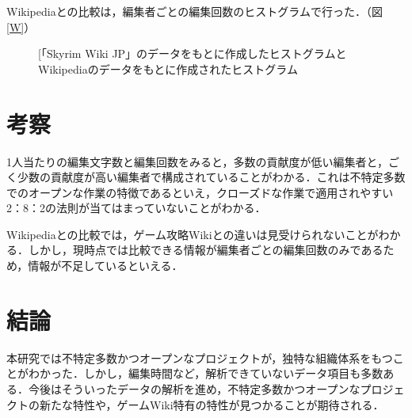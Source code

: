 \documentclass[uplatex,twocolumn,dvipdfmx]{jsarticle}
\begin{document}
Wikipediaとの比較は，編集者ごとの編集回数のヒストグラムで行った．（図\ref{W}）


\begin{figure}[t]
 \begin{center}
 \caption{[「Skyrim Wiki JP」のデータをもとに作成したヒストグラムとWikipediaのデータをもとに作成されたヒストグラム}
\end{center}
 \end{figure}
 
\section{考察}

1人当たりの編集文字数と編集回数をみると，多数の貢献度が低い編集者と，ごく少数の貢献度が高い編集者で構成されていることがわかる．これは不特定多数でのオープンな作業の特徴であるといえ，クローズドな作業で適用されやすい2：8：2の法則が当てはまっていないことがわかる．

Wikipediaとの比較では，ゲーム攻略Wikiとの違いは見受けられないことがわかる．しかし，現時点では比較できる情報が編集者ごとの編集回数のみであるため，情報が不足しているといえる．

\section{結論}

本研究では不特定多数かつオープンなプロジェクトが，独特な組織体系をもつことがわかった．しかし，編集時間など，解析できていないデータ項目も多数ある．今後はそういったデータの解析を進め，不特定多数かつオープンなプロジェクトの新たな特性や，ゲームWiki特有の特性が見つかることが期待される．


\end{document}
